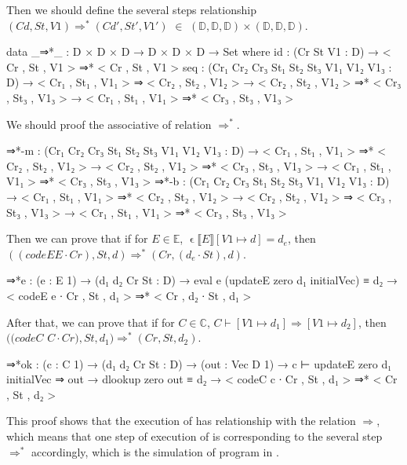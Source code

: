 Then we should define the several steps relationship $(Cd,St,V1)\Rightarrow^*(Cd',St',V1')$ $\in$  $(\mathds{D},\mathds{D},\mathds{D})\times (\mathds{D},\mathds{D},\mathds{D})$.
\begin{code}
data _⇒*_ : D × D × D → D × D × D → Set where
  id   : (Cr St V1 : D) → < Cr , St , V1 > ⇒* < Cr , St , V1 >
  seq  : (Cr₁ Cr₂ Cr₃ St₁ St₂ St₃ V1₁ V1₂ V1₃ : D)
         → < Cr₁ , St₁ , V1₁ > ⇒  < Cr₂ , St₂ , V1₂ >
         → < Cr₂ , St₂ , V1₂ > ⇒* < Cr₃ , St₃ , V1₃ >
         → < Cr₁ , St₁ , V1₁ > ⇒* < Cr₃ , St₃ , V1₃ >
\end{code}
We should proof the associative of relation $\Rightarrow^*$.
\begin{code}
  ⇒*-m : (Cr₁ Cr₂ Cr₃ St₁ St₂ St₃ V1₁ V1₂ V1₃ : D)
              → < Cr₁ , St₁ , V1₁ > ⇒* < Cr₂ , St₂ , V1₂ >
              → < Cr₂ , St₂ , V1₂ > ⇒* < Cr₃ , St₃ , V1₃ >
              → < Cr₁ , St₁ , V1₁ > ⇒* < Cr₃ , St₃ , V1₃ >
  ⇒*-b : (Cr₁ Cr₂ Cr₃ St₁ St₂ St₃ V1₁ V1₂ V1₃ : D)
              → < Cr₁ , St₁ , V1₁ > ⇒* < Cr₂ , St₂ , V1₂ >
              → < Cr₂ , St₂ , V1₂ > ⇒  < Cr₃ , St₃ , V1₃ >
              → < Cr₁ , St₁ , V1₁ > ⇒* < Cr₃ , St₃ , V1₃ >
\end{code}
Then we can prove that if for $E \in \mathds{E}$, $\upvarepsilon \llbracket E \rrbracket [V1 \mapsto d] = d_e$, then $((codeE E\cdot Cr),St,d)\Rightarrow^*(Cr,(d_e\cdot St),d)$.
\begin{code}
⇒*e : (e : E 1) → (d₁ d₂ Cr St : D)
       → eval e (updateE zero d₁ initialVec) ≡ d₂
       → < codeE e ∙ Cr , St , d₁ > ⇒* < Cr , d₂ ∙ St , d₁ >
\end{code}
After that, we can prove that if for $C \in \mathds{C}$, $C \vdash [V1 \mapsto d_1] \Rightarrow [V1 \mapsto d_2]$, then $((codeC$ $C\cdot Cr),St,d_1)\Rightarrow^*(Cr,St,d_2)$.
\begin{code}
⇒*ok : (c : C 1) → (d₁ d₂ Cr St : D) → (out : Vec D 1)
       → c ⊢ updateE zero d₁ initialVec ⇒ out
       → dlookup zero out ≡ d₂
       → < codeC c ∙ Cr , St , d₁ > ⇒* < Cr , St , d₂ >
\end{code}
This proof shows that the execution of  has relationship with the relation $\Rightarrow$, which means that one step of execution of  is corresponding to the several step $\Rightarrow^*$ accordingly, which is the simulation of \WHILE program in .
